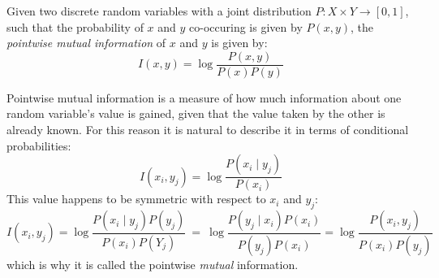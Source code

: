 \begin{definition}
  Given two discrete random variables with a joint distribution $P:X\times Y\to [0,1]$, such that the probability of $x$ and $y$ co-occuring is given by $P(x,y)$, the \emph{pointwise mutual information} of $x$ and $y$ is given by:
  \begin{equation}
    I(x,y)=\log\frac{P(x,y)}{P(x)P(y)}\label{eq:pmi}
  \end{equation}
\end{definition}

Pointwise mutual information is a measure of how much information about one random variable's value is gained, given that the value taken by the other is already known. For this reason it is natural to describe it in terms of conditional probabilities:
\begin{equation}
  I(x_i,y_j)=\log\frac{P(x_i\mid y_j)}{P(x_i)}
\end{equation}
This value happens to be symmetric with respect to $x_i$ and $y_j$:
\begin{equation}
  I(x_i,y_j)= \log\frac{P(x_i\mid y_j)P(y_j)}{P(x_i)P(Y_j)}\ =\ \log\frac{P(y_j\mid x_i)P(x_i)}{P(y_j)P(x_i)}=\log\frac{P(x_i, y_j)}{P(x_i)P(y_j)}
\end{equation}
which is why it is called the pointwise \emph{mutual} information.

